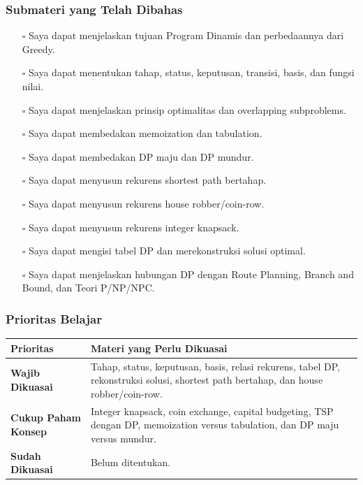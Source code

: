 \subsubsection{Submateri yang Telah Dibahas}
\begin{itemize}
    \item[$\square$] Saya dapat menjelaskan tujuan Program Dinamis dan perbedaannya dari Greedy.
    \item[$\square$] Saya dapat menentukan tahap, status, keputusan, transisi, basis, dan fungsi nilai.
    \item[$\square$] Saya dapat menjelaskan prinsip optimalitas dan overlapping subproblems.
    \item[$\square$] Saya dapat membedakan memoization dan tabulation.
    \item[$\square$] Saya dapat membedakan DP maju dan DP mundur.
    \item[$\square$] Saya dapat menyusun rekurens shortest path bertahap.
    \item[$\square$] Saya dapat menyusun rekurens house robber/coin-row.
    \item[$\square$] Saya dapat menyusun rekurens integer knapsack.
    \item[$\square$] Saya dapat mengisi tabel DP dan merekonstruksi solusi optimal.
    \item[$\square$] Saya dapat menjelaskan hubungan DP dengan Route Planning, Branch and Bound, dan Teori P/NP/NPC.
\end{itemize}

\subsubsection{Prioritas Belajar}
\begin{tabularx}{\textwidth}{|L{0.22\textwidth}|X|}
\hline
\textbf{Prioritas} & \textbf{Materi yang Perlu Dikuasai} \\
\hline
\textbf{Wajib Dikuasai} & Tahap, status, keputusan, basis, relasi rekurens, tabel DP, rekonstruksi solusi, shortest path bertahap, dan house robber/coin-row. \\
\hline
\textbf{Cukup Paham Konsep} & Integer knapsack, coin exchange, capital budgeting, TSP dengan DP, memoization versus tabulation, dan DP maju versus mundur. \\
\hline
\textbf{Sudah Dikuasai} & Belum ditentukan. \\
\hline
\end{tabularx}
